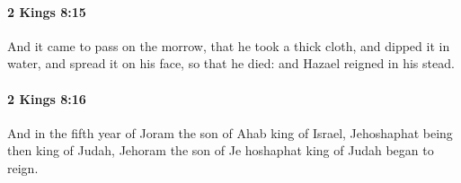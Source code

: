 		\paragraph{2 Kings 8:15} %
			\label{2KINGS-8-15}

			And it came to pass on the morrow, that he took a thick cloth, and dipped it in water, and spread it on his face, so that he died: and Hazael reigned in his stead.


		\paragraph{2 Kings 8:16} %
			\label{2KINGS-8-16}

			And in the fifth year of Joram the son of Ahab king of Israel, Jehoshaphat being then king of Judah, Jehoram the son of Je hoshaphat king of Judah began to reign.


